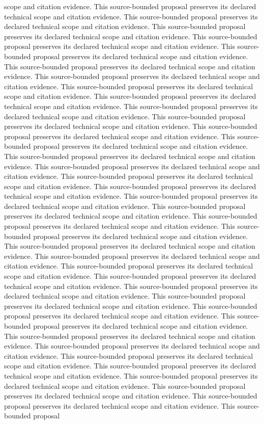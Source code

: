 \documentclass{article}
\begin{document}
scope and citation evidence. This source-bounded proposal preserves its declared technical scope and citation evidence. This source-bounded proposal preserves its declared technical scope and citation evidence. This source-bounded proposal preserves its declared technical scope and citation evidence. This source-bounded proposal preserves its declared technical scope and citation evidence. This source-bounded proposal preserves its declared technical scope and citation evidence. This source-bounded proposal preserves its declared technical scope and citation evidence. This source-bounded proposal preserves its declared technical scope and citation evidence. This source-bounded proposal preserves its declared technical scope and citation evidence. This source-bounded proposal preserves its declared technical scope and citation evidence. This source-bounded proposal preserves its declared technical scope and citation evidence. This source-bounded proposal preserves its declared technical scope and citation evidence. This source-bounded proposal preserves its declared technical scope and citation evidence. This source-bounded proposal preserves its declared technical scope and citation evidence. This source-bounded proposal preserves its declared technical scope and citation evidence. This source-bounded proposal preserves its declared technical scope and citation evidence. This source-bounded proposal preserves its declared technical scope and citation evidence. This source-bounded proposal preserves its declared technical scope and citation evidence. This source-bounded proposal preserves its declared technical scope and citation evidence. This source-bounded proposal preserves its declared technical scope and citation evidence. This source-bounded proposal preserves its declared technical scope and citation evidence. This source-bounded proposal preserves its declared technical scope and citation evidence. This source-bounded proposal preserves its declared technical scope and citation evidence. This source-bounded proposal preserves its declared technical scope and citation evidence. This source-bounded proposal preserves its declared technical scope and citation evidence. This source-bounded proposal preserves its declared technical scope and citation evidence. This source-bounded proposal preserves its declared technical scope and citation evidence. This source-bounded proposal preserves its declared technical scope and citation evidence. This source-bounded proposal preserves its declared technical scope and citation evidence. This source-bounded proposal preserves its declared technical scope and citation evidence. This source-bounded proposal preserves its declared technical scope and citation evidence. This source-bounded proposal preserves its declared technical scope and citation evidence. This source-bounded proposal preserves its declared technical scope and citation evidence. This source-bounded proposal preserves its declared technical scope and citation evidence. This source-bounded proposal preserves its declared technical scope and citation evidence. This source-bounded proposal preserves its declared technical scope and citation evidence. This source-bounded proposal preserves its declared technical scope and citation evidence. This source-bounded proposal 
\end{document}
